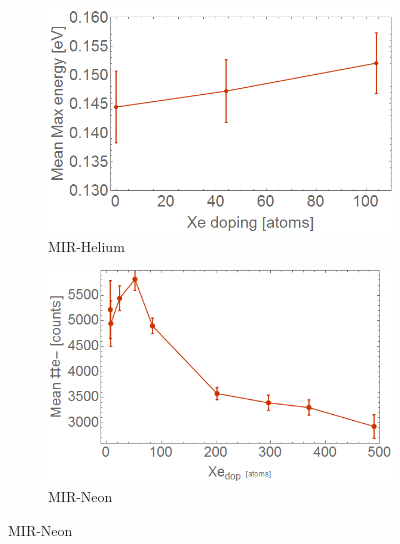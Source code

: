 \begin{figure}[h!]
\begin{subfigure}[l]{0.48\textwidth} \caption{MIR-Helium}
\includegraphics[width=1\textwidth]{../Images/results/MIR_He_XeCaDop/Xe_Meanenerg.png}  \end{subfigure}
\begin{subfigure}[l]{0.48\textwidth} \caption{MIR-Neon } 
\includegraphics[width=1\textwidth]{../Images/results/MIR_Ne_XeDop_39K/MeanEnerg.png} \end{subfigure}


\end{figure}
